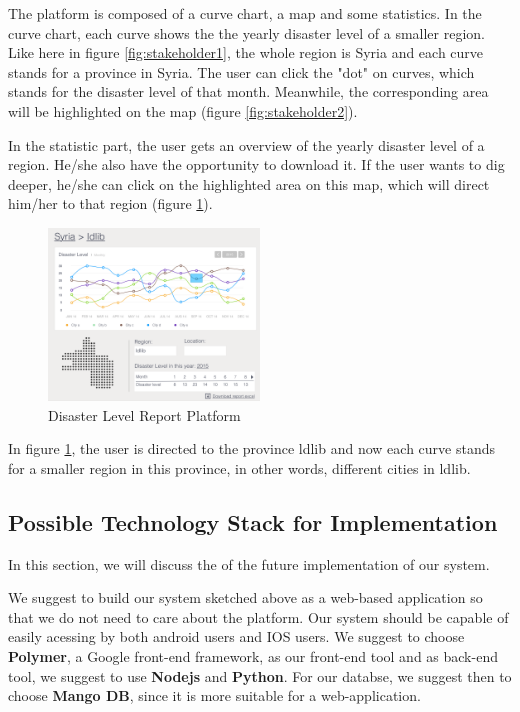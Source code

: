       The platform is composed of a curve chart,
      a map and some statistics.
      In the curve chart,
      each curve shows the the yearly disaster level of a smaller region.
      Like here in figure \ref{fig:stakeholder1}, 
      the whole region is Syria and each curve stands for a province in Syria.
      The user can click the "dot" on curves,
      which stands for the disaster level of that month.
      Meanwhile, the corresponding area will be highlighted on the map (figure \ref{fig:stakeholder2}).

      In the statistic part,
      the user gets an overview of the yearly disaster level of a region.
      He/she also have the opportunity to download it.
      If the user wants to dig deeper, 
      he/she can click on the highlighted area on this map,
      which will direct him/her to that region (figure \ref{fig:stakeholder3}).

      \begin{figure}[H]
      \centering
      \includegraphics[width=0.5\textwidth]{figures/function-stakeholder-3}
      \caption{Disaster Level Report Platform}
      \label{fig:stakeholder3}
      \end{figure}

      In figure \ref{fig:stakeholder3},
      the user is directed to the province ldlib and now each curve stands for a smaller region in this province,
      in other words, different cities in ldlib.
    
    \subsection{Possible Technology Stack for Implementation}
    In this section, we will discuss the of the future implementation of our system. 

    We suggest to build our system sketched above as a web-based application so that we do not need to care about the platform.
    Our system should be capable of easily acessing by both android users and IOS users. We suggest to choose \textbf{Polymer}, a Google front-end framework, as our front-end tool and as back-end tool, we suggest to use \textbf{Nodejs} and \textbf{Python}. For our databse, we suggest then to choose \textbf{Mango DB}, since it is more suitable for a web-application.